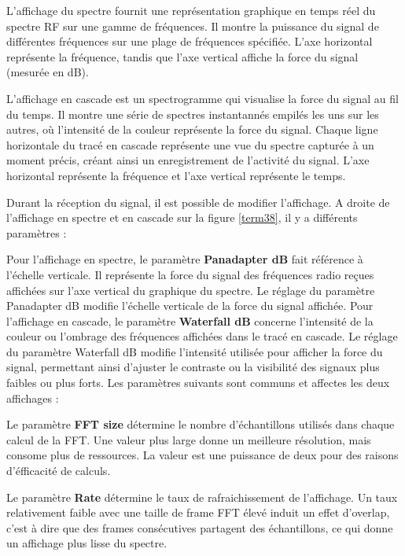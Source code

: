 L'affichage du spectre fournit une représentation graphique en temps réel du spectre RF sur une gamme de fréquences.
Il montre la puissance du signal de différentes fréquences sur une plage de fréquences spécifiée.
L'axe horizontal représente la fréquence, tandis que l'axe vertical affiche la force du signal (mesurée en dB).

\vspace{0.1cm}

L'affichage en cascade est un spectrogramme qui visualise la force du signal au fil du temps.
Il montre une série de spectres instantannés empilés les uns sur les autres, où l'intensité de la couleur représente la force du signal.
Chaque ligne horizontale du tracé en cascade représente une vue du spectre capturée à un moment précis, créant ainsi un enregistrement de l'activité du signal.
L'axe horizontal représente la fréquence et l'axe vertical représente le temps.

\vspace{0.1cm}

Durant la réception du signal, il est possible de modifier l'affichage. A droite de l'affichage en spectre et en cascade sur la figure \ref{term38}, il y a différents paramètres :

Pour l'affichage en spectre, le paramètre \textbf{Panadapter dB} fait référence à l'échelle verticale. Il représente la force du signal des fréquences radio reçues affichées sur l'axe vertical du graphique du spectre. Le réglage du paramètre Panadapter dB modifie l’échelle verticale de la force du signal affichée. Pour l'affichage en cascade, le paramètre \textbf{Waterfall dB} concerne l'intensité de la couleur ou l'ombrage des fréquences affichées dans le tracé en cascade. Le réglage du paramètre Waterfall dB modifie l'intensité utilisée pour afficher la force du signal, permettant ainsi d'ajuster le contraste ou la visibilité des signaux plus faibles ou plus forts. Les paramètres suivants sont communs et affectes les deux affichages :

\vspace{0.1cm}

Le paramètre \textbf{FFT size} détermine le nombre d'échantillons utilisés dans chaque calcul de la FFT. Une valeur plus large donne un meilleure résolution, mais consome plus de ressources. La valeur est une puissance de deux pour des raisons d'éfficacité de calculs.

\vspace{0.1cm}

Le paramètre \textbf{Rate} détermine le taux de rafraichissement de l'affichage. Un taux relativement faible avec une taille de frame FFT élevé induit un effet d'overlap, c'est à dire que des frames consécutives partagent des échantillons, ce qui donne un affichage plus lisse du spectre.


